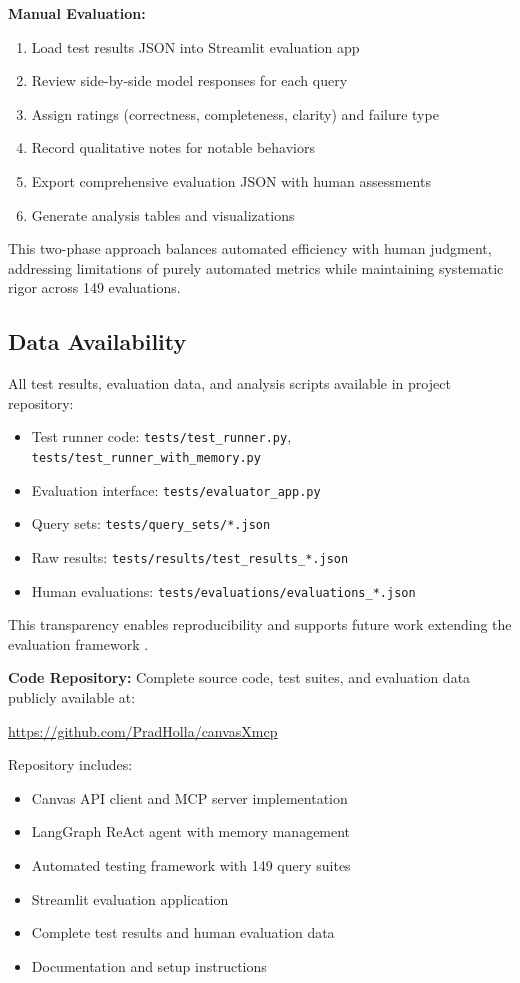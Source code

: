 \documentclass{article}
\begin{document}
\textbf{Manual Evaluation:}
\begin{enumerate}
    \item Load test results JSON into Streamlit evaluation app
    \item Review side-by-side model responses for each query
    \item Assign ratings (correctness, completeness, clarity) and failure type
    \item Record qualitative notes for notable behaviors
    \item Export comprehensive evaluation JSON with human assessments
    \item Generate analysis tables and visualizations
\end{enumerate}

This two-phase approach balances automated efficiency with human judgment, addressing limitations of purely automated metrics \cite{teachable2025agents} while maintaining systematic rigor across 149 evaluations.

\subsection{Data Availability}

All test results, evaluation data, and analysis scripts available in project repository:
\begin{itemize}
    \item Test runner code: \texttt{tests/test\_runner.py}, \texttt{tests/test\_runner\_with\_memory.py}
    \item Evaluation interface: \texttt{tests/evaluator\_app.py}
    \item Query sets: \texttt{tests/query\_sets/*.json}
    \item Raw results: \texttt{tests/results/test\_results\_*.json}
    \item Human evaluations: \texttt{tests/evaluations/evaluations\_*.json}
\end{itemize}

This transparency enables reproducibility and supports future work extending the evaluation framework \cite{genai2024higher}.

\textbf{Code Repository:} Complete source code, test suites, and evaluation data publicly available at:

\url{https://github.com/PradHolla/canvasXmcp}

Repository includes:
\begin{itemize}
    \item Canvas API client and MCP server implementation
    \item LangGraph ReAct agent with memory management
    \item Automated testing framework with 149 query suites
    \item Streamlit evaluation application
    \item Complete test results and human evaluation data
    \item Documentation and setup instructions
\end{itemize}
\end{document}
